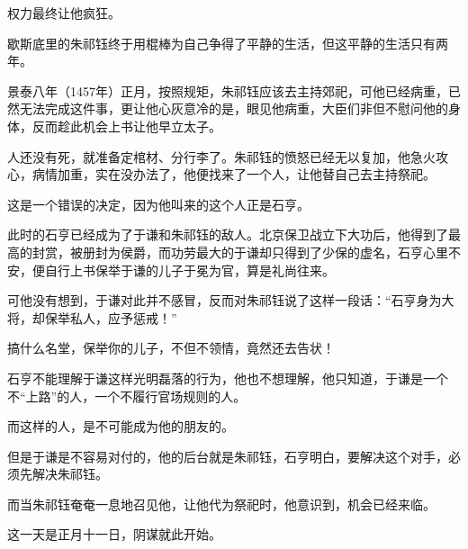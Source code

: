\begin{multicols}{\theparacolNo}
权力最终让他疯狂。

歇斯底里的朱祁钰终于用棍棒为自己争得了平静的生活，但这平静的生活只有两年。

景泰八年（1457年）正月，按照规矩，朱祁钰应该去主持郊祀，可他已经病重，已然无法完成这件事，更让他心灰意冷的是，眼见他病重，大臣们非但不慰问他的身体，反而趁此机会上书让他早立太子。

人还没有死，就准备定棺材、分行李了。朱祁钰的愤怒已经无以复加，他急火攻心，病情加重，实在没办法了，他便找来了一个人，让他替自己去主持祭祀。

这是一个错误的决定，因为他叫来的这个人正是石亨。

此时的石亨已经成为了于谦和朱祁钰的敌人。北京保卫战立下大功后，他得到了最高的封赏，被册封为侯爵，而功劳最大的于谦却只得到了少保的虚名，石亨心里不安，便自行上书保举于谦的儿子于冕为官，算是礼尚往来。

可他没有想到，于谦对此并不感冒，反而对朱祁钰说了这样一段话：“石亨身为大将，却保举私人，应予惩戒！”

搞什么名堂，保举你的儿子，不但不领情，竟然还去告状！

石亨不能理解于谦这样光明磊落的行为，他也不想理解，他只知道，于谦是一个不“上路”的人，一个不履行官场规则的人。

而这样的人，是不可能成为他的朋友的。

但是于谦是不容易对付的，他的后台就是朱祁钰，石亨明白，要解决这个对手，必须先解决朱祁钰。

而当朱祁钰奄奄一息地召见他，让他代为祭祀时，他意识到，机会已经来临。

这一天是正月十一日，阴谋就此开始。
\ifnum{}
	\end{multicols}
\fi
\newpage
